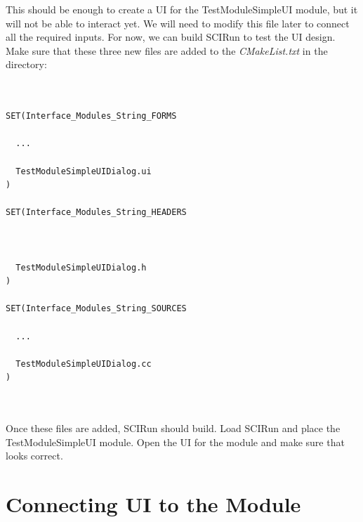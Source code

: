 \documentclass[fleqn,11pt,openany]{book}
\begin{document}
This should be enough to create a UI for the TestModuleSimpleUI module, but it will not be able to interact yet.
We will need to modify this file later to connect all the required inputs.  
For now, we can build SCIRun to test the UI design.  
Make sure that these three new files are added to the \emph{CMakeList.txt} in the \emph{} directory:
\begin{verbatim}


SET(Interface_Modules_String_FORMS
  
  ...
  
  TestModuleSimpleUIDialog.ui
)

SET(Interface_Modules_String_HEADERS



  TestModuleSimpleUIDialog.h
)

SET(Interface_Modules_String_SOURCES 
  
  ...
  
  TestModuleSimpleUIDialog.cc
)



\end{verbatim}

Once these files are added, SCIRun should build. 
Load SCIRun and place the TestModuleSimpleUI module.  
Open the UI for the module and make sure that looks correct.  


\section{Connecting UI to the Module}
\label{sec:connectUI}
\end{document}
